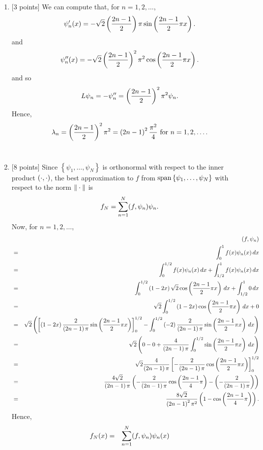 \begin{solution}
\begin{enumerate}
\item {[3 points]} We can compute that, for $n=1,2,\ldots$,
\[
\psi_n'(x)=-\sqrt{2} \left({2n-1\over 2}\right) \pi \sin\left({2n-1\over 2} \pi x\right).
\]
and
\[
\psi_n''(x)=-\sqrt{2} \left({2n-1\over 2}\right)^2 \pi^2 \cos\left({2n-1\over 2} \pi x\right).
\]
and so
\[
L\psi_n=-\psi_n''=\left({2n-1\over 2}\right)^2\pi^2\psi_n.
\]
Hence,
\[
\lambda_n = \left({2n-1\over 2}\right)^2 \pi^2 = \left(2n-1\right)^2 {\pi^2\over4}\mbox{ for } n = 1, 2, \ldots.
\]
\\
\item {[8 points]} Since $\left\{\psi_1,\ldots,\psi_N\right\}$ is orthonormal with respect to the inner product $(\cdot,\cdot)$, the best approximation to $f$ from ${\rm span}\left\{\psi_1,\ldots,\psi_N\right\}$ with respect to the norm $\|\cdot\|$ is
\[
f_N=\sum_{n=1}^N(f,\psi_n)\psi_n.
\]
Now, for $n=1,2,\ldots$,
\begin{eqnarray*}
&&(f,\psi_n)
\\
&=&\int_0^1f(x)\psi_n(x)\,dx
\\
&=&\int_0^{1/2}f(x)\psi_n(x)\,dx+\int_{1/2}^1f(x)\psi_n(x)\,dx
\\
&=&\int_0^{1/2}\left(1-2x\right)\sqrt{2}\cos\left({2n-1\over 2}\pi x\right)\,dx+\int_{1/2}^10\,dx
\\
&=&\sqrt{2}\int_0^{1/2}\left(1-2x\right)\cos\left({2n-1\over 2}\pi x\right)\,dx+0
\\
&=&\sqrt{2}\left(\left[\left(1-2x\right){2\over \left(2n-1\right)\pi}\sin\left({2n-1\over 2}\pi x\right)\right]_0^{1/2}-\int_0^{1/2}\left(-2\right){2\over \left(2n-1\right)\pi}\sin\left({2n-1\over 2}\pi x\right)\,dx\right)
\\
&=&\sqrt{2}\left(0-0+{4\over \left(2n-1\right)\pi}\int_0^{1/2}\sin\left({2n-1\over 2}\pi x\right)\,dx\right)
\\
&=&\sqrt{2}{4\over \left(2n-1\right)\pi}\left[-{2\over \left(2n-1\right)\pi}\cos\left({2n-1\over 2}\pi x\right)\right]_0^{1/2}
\\
&=&{4\sqrt{2}\over \left(2n-1\right)\pi}\left(-{2\over \left(2n-1\right)\pi}\cos\left({2n-1\over 4}\pi \right)-\left(-{2\over \left(2n-1\right)\pi}\right)\right)
\\
&=&{8\sqrt{2}\over \left(2n-1\right)^2\pi^2}\left(1-\cos\left({2n-1\over 4}\pi \right)\right).
\end{eqnarray*}
Hence,
\begin{eqnarray*}
f_N(x)&=&\sum_{n=1}^N\ip{f,\psi_n}\psi_n(x)

\end{eqnarray*}
\end{enumerate}
\end{solution}
